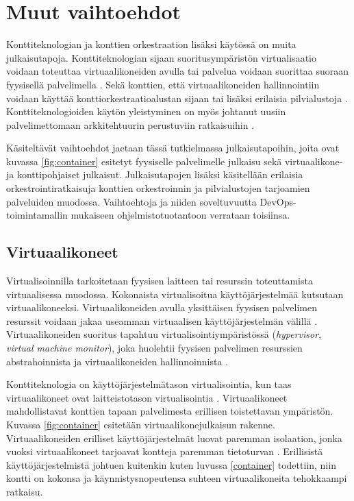 \chapter{Muut vaihtoehdot\label{options}}

Konttiteknologian ja konttien orkestraation lisäksi käytössä on muita julkaisutapoja. Konttiteknologian sijaan suoritusympäristön virtualisaatio voidaan toteuttaa virtuaalikoneiden avulla tai palvelua voidaan suorittaa suoraan fyysisellä palvelimella \cite{Watada19}.
Sekä konttien, että virtuaalikoneiden hallinnointiin voidaan käyttää konttiorkestraatioalustan sijaan tai lisäksi erilaisia pilvialustoja \cite{Bousselmi14}.
Konttiteknologioiden käytön yleistyminen on myös johtanut uusiin palvelimettomaan arkkitehtuurin perustuviin ratkaisuihin \cite{Baldini17}.

Käsiteltävät vaihtoehdot jaetaan tässä tutkielmassa julkaisutapoihin, joita ovat kuvassa \ref{fig:container} esitetyt fyysiselle palvelimelle julkaisu sekä virtuaalikone- ja konttipohjaiset julkaisut.
Julkaisutapojen lisäksi käsitellään erilaisia orkestrointiratkaisuja konttien orkestroinnin ja pilvialustojen tarjoamien palveluiden muodossa.
Vaihtoehtoja ja niiden soveltuvuutta DevOps-toimintamallin mukaiseen ohjelmistotuotantoon verrataan toisiinsa.

\section{Virtuaalikoneet}


Virtualisoinnilla tarkoitetaan fyysisen laitteen tai resurssin toteuttamista virtuaalisessa muodossa.
Kokonaista virtualisoitua käyttöjärjestelmää kutsutaan virtuaalikoneeksi.
Virtuaalikoneiden avulla yksittäisen fyysisen palvelimen resurssit voidaan jakaa useamman virtuaalisen käyttöjärjestelmän välillä \cite{Smith05}.
Virtuaalikoneiden suoritus tapahtuu virtualisointiympäristössä (\textit{hypervisor}, \textit{virtual machine monitor}), joka huolehtii fyysisen palvelimen resurssien abstrahoinnista ja virtuaalikoneiden hallinnoinnista \cite{desai13}.

Konttiteknologia on käyttöjärjestelmätason virtualisointia, kun taas virtuaalikoneet ovat laitteistotason virtualisointia \cite{Compastie20}.
Virtuaalikoneet mahdollistavat konttien tapaan palvelimesta erillisen toistettavan ympäristön.
Kuvassa \ref{fig:container} esitetään virtuaalikonejulkaisun rakenne.
Virtuaalikoneiden erilliset käyttöjärjestelmät luovat paremman isolaation, jonka vuoksi virtuaalikoneet tarjoavat kontteja paremman tietoturvan \cite{Sultan19}.
Erillisistä käyttöjärjestelmistä johtuen kuitenkin kuten luvussa \ref{container} todettiin, niin kontti on kokonsa ja käynnistysnopeutensa suhteen virtuaalikoneita tehokkaampi ratkaisu.

